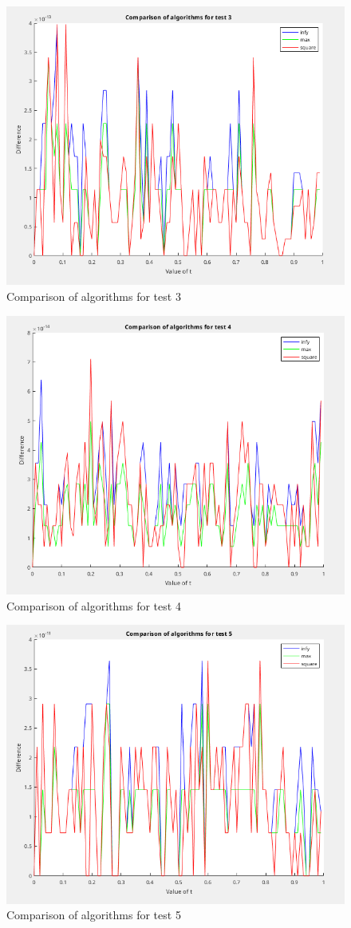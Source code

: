 \documentclass[]{article}
\begin{document}
\begin{figure}
	\centering
	\includegraphics[width=0.8\linewidth]{figs/test03.png}
	\caption{Comparison of algorithms for test 3}
	\label{fig:03}
\end{figure}

\begin{figure}
	\centering
	\includegraphics[width=0.8\linewidth]{figs/test04.png}
	\caption{Comparison of algorithms for test 4}
	\label{fig:04}
\end{figure}

\begin{figure}
	\centering
	\includegraphics[width=0.8\linewidth]{figs/test05.png}
	\caption{Comparison of algorithms for test 5}
	\label{fig:05}
\end{figure}
\end{document}
